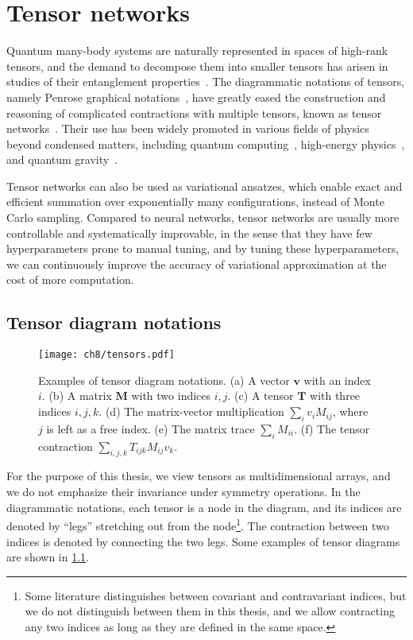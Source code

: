 \chapter{Tensor networks}
\label{ch:tn}

Quantum many-body systems are naturally represented in spaces of high-rank tensors, and the demand to decompose them into smaller tensors has arisen in studies of their entanglement properties~\cite{white1992density}. The diagrammatic notations of tensors, namely Penrose graphical notations~\cite{penrose1971applications}, have greatly eased the construction and reasoning of complicated contractions with multiple tensors, known as tensor networks~\cite{bridgeman2017hand, orus2014practical}. Their use has been widely promoted in various fields of physics beyond condensed matters, including quantum computing~\cite{feynman1986quantum, nielsen2010quantum}, high-energy physics~\cite{banuls2018tensor, banuls2020review}, and quantum gravity~\cite{perez2013spin, you2016entanglement, hayden2016holographic, asaduzzaman2020tensor}.

Tensor networks can also be used as variational ansatzes, which enable exact and efficient summation over exponentially many configurations, instead of Monte Carlo sampling. Compared to neural networks, tensor networks are usually more controllable and systematically improvable, in the sense that they have few hyperparameters prone to manual tuning, and by tuning these hyperparameters, we can continuously improve the accuracy of variational approximation at the cost of more computation.

\section{Tensor diagram notations}

\begin{figure}[htb]
\centering
\texttt{[image: ch8/tensors.pdf]}
\caption[Tensor diagram notations]{
Examples of tensor diagram notations.
(a) A vector $\bm{v}$ with an index $i$.
(b) A matrix $\bm{M}$ with two indices $i, j$.
(c) A tensor $\bm{T}$ with three indices $i, j, k$.
(d) The matrix-vector multiplication $\sum_i v_i M_{i j}$, where $j$ is left as a free index.
(e) The matrix trace $\sum_i M_{i i}$.
(f) The tensor contraction $\sum_{i, j, k} T_{i j k} M_{i j} v_k$.
}
\label{fig:tensors}
\end{figure}

For the purpose of this thesis, we view tensors as multidimensional arrays, and we do not emphasize their invariance under symmetry operations. In the diagrammatic notations, each tensor is a node in the diagram, and its indices are denoted by ``legs'' stretching out from the node\footnote{Some literature distinguishes between covariant and contravariant indices, but we do not  distinguish between them in this thesis, and we allow contracting any two indices as long as they are defined in the same space.}. The contraction between two indices is denoted by connecting the two legs. Some examples of tensor diagrams are shown in \cref{fig:tensors}.

